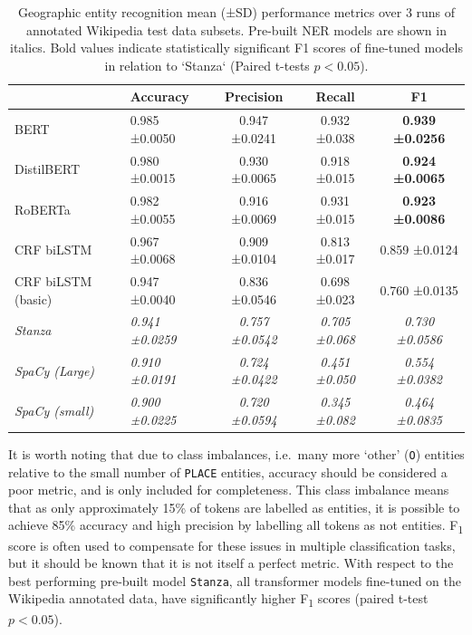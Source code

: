 \documentclass[]{interact}
\theoremstyle{plain}%
\theoremstyle{definition}
\theoremstyle{remark}
\begin{document}
\begin{table}

\caption{\label{tab:eval}Geographic entity recognition mean (±SD) performance metrics over 3 runs of annotated Wikipedia test data subsets. Pre-built NER models are shown in italics. Bold values indicate statistically significant F1 scores of fine-tuned models in relation to `Stanza` (Paired t-tests $p<0.05$).}
\centering
\fontsize{9}{11}\selectfont
\begin{tabular}[t]{llccc}
\toprule
\textbf{ } & \textbf{Accuracy} & \textbf{Precision} & \textbf{Recall} & \textbf{F1}\\
\midrule
BERT & 0.985 ±0.0050 & 0.947 ±0.0241 & 0.932 ±0.038 & \textbf{0.939 ±0.0256}\\
DistilBERT & 0.980 ±0.0015 & 0.930 ±0.0065 & 0.918 ±0.015 & \textbf{0.924 ±0.0065}\\
RoBERTa & 0.982 ±0.0055 & 0.916 ±0.0069 & 0.931 ±0.015 & \textbf{0.923 ±0.0086}\\
CRF biLSTM & 0.967 ±0.0068 & 0.909 ±0.0104 & 0.813 ±0.017 & 0.859 ±0.0124\\
CRF biLSTM (basic) & 0.947 ±0.0040 & 0.836 ±0.0546 & 0.698 ±0.023 & 0.760 ±0.0135\\
\midrule
\em{Stanza} & \em{0.941 ±0.0259} & \em{0.757 ±0.0542} & \em{0.705 ±0.068} & \em{0.730 ±0.0586}\\
\em{SpaCy (Large)} & \em{0.910 ±0.0191} & \em{0.724 ±0.0422} & \em{0.451 ±0.050} & \em{0.554 ±0.0382}\\
\em{SpaCy (small)} & \em{0.900 ±0.0225} & \em{0.720 ±0.0594} & \em{0.345 ±0.082} & \em{0.464 ±0.0835}\\
\bottomrule
\end{tabular}
\end{table}

It is worth noting that due to class imbalances, i.e.~many more `other'
(\texttt{O}) entities relative to the small number of \texttt{PLACE}
entities, accuracy should be considered a poor metric, and is only
included for completeness. This class imbalance means that as only
approximately 15\% of tokens are labelled as entities, it is possible to
achieve 85\% accuracy and high precision by labelling all tokens as not
entities. F\textsubscript{1} score is often used to compensate for these
issues in multiple classification tasks, but it should be known that it
is not itself a perfect metric. With respect to the best performing
pre-built model \texttt{Stanza}, all transformer models fine-tuned on
the Wikipedia annotated data, have significantly higher
F\textsubscript{1} scores (paired t-test \(p<0.05\)).
\end{document}
